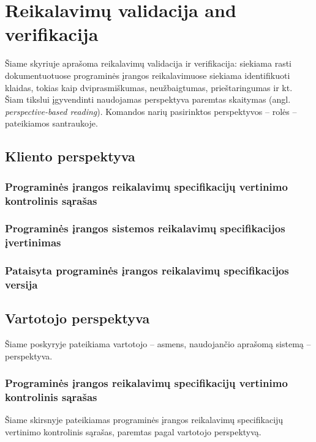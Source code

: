 \documentclass{VUMIFPSkursinis}
\begin{document}
\section{Reikalavimų validacija and verifikacija}

Šiame skyriuje aprašoma reikalavimų validacija ir verifikacija: siekiama rasti dokumentuotuose programinės įrangos
reikalavimuose siekiama identifikuoti klaidas, tokias kaip dviprasmiškumas, neužbaigtumas, prieštaringumas ir kt.
Šiam tikslui įgyvendinti naudojamas perspektyva paremtas skaitymas (angl. \textit{perspective-based reading}). Komandos narių
pasirinktos perspektyvos -- rolės -- pateikiamos santraukoje.

\subsection{Kliento perspektyva}

\subsubsection{Programinės įrangos reikalavimų specifikacijų vertinimo kontrolinis sąrašas}

\subsubsection{Programinės įrangos sistemos reikalavimų specifikacijos įvertinimas}

\subsubsection{Pataisyta programinės įrangos reikalavimų specifikacijos versija}

\subsection{Vartotojo perspektyva}

Šiame poskyryje pateikiama vartotojo -- asmens, naudojančio aprašomą sistemą -- perspektyva.

\subsubsection{Programinės įrangos reikalavimų specifikacijų vertinimo kontrolinis sąrašas}

Šiame skirsnyje pateikiamas programinės įrangos reikalavimų specifikacijų vertinimo kontrolinis sąrašas, paremtas pagal vartotojo perspektyvą.
\end{document}
